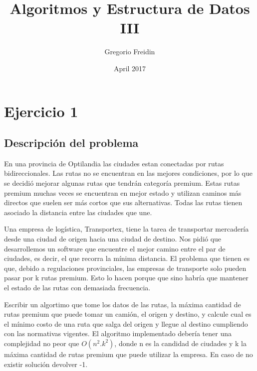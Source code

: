 \documentclass{article}
\title{Algoritmos y Estructura de Datos III}
\author{Gregorio Freidin }
\date{April 2017}
\begin{document}
\section{Ejercicio 1}
\subsection{Descripción del problema}
\par{\hspace{1cm}En una provincia de Optilandia las ciudades estan conectadas por rutas bidireccionales. Las rutas no se encuentran en las mejores condiciones, por lo que se decidió mejorar algunas rutas que tendrán categoría premium. Estas rutas premium muchas veces se encuentran en mejor estado y utilizan caminos m\'as directos que suelen ser m\'as cortos que sus alternativas. Todas las rutas tienen asociado la distancia entre las ciudades que une.}
\medskip
\par{ Una empresa de log\'istica, Transportex, tiene la tarea de transportar mercader\'ia desde una ciudad de origen hacia una ciudad de destino. Nos pidi\'o que desarrollemos un software que encuentre el mejor camino entre el par de ciudades, es decir, el que recorra la m\'inima distancia.
El problema que tienen es que, debido a regulaciones provinciales, las empresas de transporte solo pueden pasar por k rutas premium. Esto lo hacen porque que sino habr\'ia que mantener el estado de las rutas con demasiada frecuencia.}
\medskip
\par{Escribir un algortimo que tome los datos de las rutas, la m\'axima cantidad de rutas premium que puede tomar un cami\'on, el origen y destino, y calcule cual es el m\'inimo costo de una ruta que salga del origen y llegue al destino cumpliendo con las normativas vigentes. El algoritmo implementado deber\'ia tener una complejidad no peor que $O(n^2.k^2 )$, donde n es la candidad de ciudades y k la m\'axima cantidad de rutas premium que puede utilizar la empresa. En caso de no existir soluci\'on devolver -1.}
\end{document}
